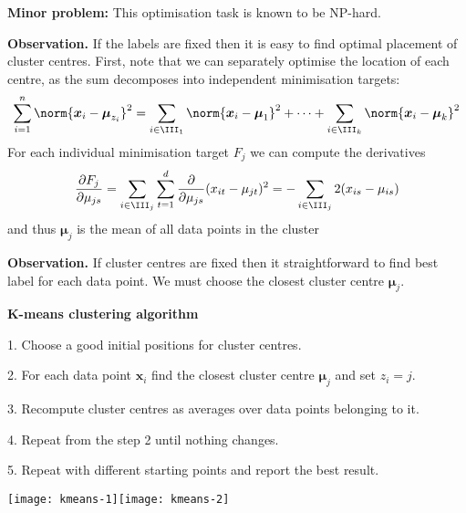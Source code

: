 \documentclass[landscape,footrule]{foils}
\renewcommand{\vec}[1]{\boldsymbol{#1}}
\begin{document}
\textbf{Minor problem:} This optimisation task is known to be NP-hard.



\textbf{Observation.} If the labels are fixed then it is easy to find optimal placement of cluster centres. First, note that we can separately optimise the location of each centre, as the sum decomposes into independent minimisation targets:  
\begin{align*}
\sum_{i=1}^n\norm{\vec{x}_i-\vec{\mu}_{z_i}}^2=\sum_{i\in\III_1}\norm{\vec{x}_i-\vec{\mu}_{1}}^2+\cdots+\sum_{i\in\III_k}\norm{\vec{x}_i-\vec{\mu}_{k}}^2
\end{align*}
For each individual minimisation target $F_j$ we can compute the derivatives
\begin{align*}
\frac{\partial F_j}{\partial \mu_{js}}=\sum_{i\in\III_j}\sum_{t=1}^d\frac{\partial}{\partial \mu_{js}}(x_{it}-\mu_{jt})^2=
-\sum_{i\in\III_j}2(x_{is}-\mu_{is})
\end{align*}
and thus $\vec{\mu}_j$ is the mean of all data points in the cluster  



\textbf{Observation.} If cluster centres are fixed then it straightforward to find best label for each data point. We must choose the closest cluster centre $\vec{\mu}_j$.
\vspace*{2cm}


\textbf{K-means clustering algorithm}
\begin{triangles}
\item[1.] Choose a good initial positions for cluster centres.
\item[2.] For each data point $\vec{x}_i$ find the closest cluster centre $\vec{\mu}_j$ and set $z_i=j$.
\item[3.] Recompute cluster centres as averages over data points belonging to it.
\item[4.] Repeat from the step 2 until nothing changes.
\item[5.] Repeat with different starting points and report the best result.   
\end{triangles}


\centerline{
\texttt{[image: kmeans-1]}\hspace*{-1.7cm}\texttt{[image: kmeans-2]}
\vspace*{-2.6cm}}
\end{document}
